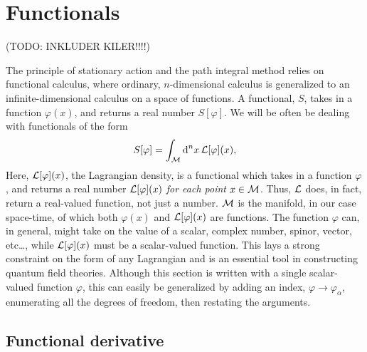 \section{Functionals}
\label{appendix: Functional derivatives}
(TODO: INKLUDER KILER!!!!)

The principle of stationary action and the path integral method relies on functional calculus, where ordinary, $n$-dimensional calculus is generalized to an infinite-dimensional calculus on a space of functions.
A functional, $S$, takes in a function $\varphi(x)$, and returns a real number $S[\varphi]$.
We will be often be dealing with functionals of the form
%
\begin{equation}
    \label{general action functional}
    S[\varphi] = \int_{\mathcal{M}} \text{d}^n x \, \mathcal{L}[\varphi](x),
\end{equation}
%
Here, $\mathcal{L}[\varphi](x)$, the Lagrangian density, is a functional which takes in a function $\varphi$, and returns a real number $\mathcal{L}[\varphi](x)$ \emph{for each point} $x \in \mathcal{M}$.
Thus, $\mathcal{L}$ does, in fact, return a real-valued function, not just a number.
$\mathcal{M}$ is the manifold, in our case space-time, of which both $\varphi(x)$ and $\mathcal{L}[\varphi](x)$ are functions.
The function $\varphi$ can, in general, might take on the value of a scalar, complex number, spinor, vector, etc\dots, while $\mathcal{L}[\varphi](x)$ must be a scalar-valued function.
This lays a strong constraint on the form of any Lagrangian and is an essential tool in constructing quantum field theories.
Although this section is written with a single scalar-valued function $\varphi$, this can easily be generalized by adding an index, $\varphi \rightarrow \varphi_\alpha$, enumerating all the degrees of freedom, then restating the arguments.


\subsection{Functional derivative}

